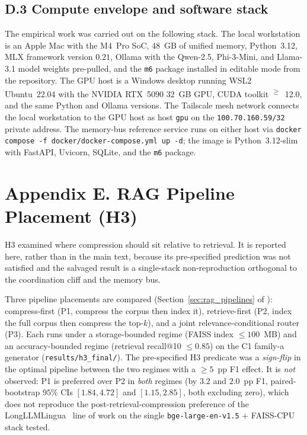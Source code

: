 \subsection{D.3 Compute envelope and software stack}

The empirical work was carried out on the following stack.
The local workstation is an Apple Mac with the M4~Pro SoC,
$48$~GB of unified memory, Python~3.12, MLX framework version
$0.21$, Ollama with the Qwen-2.5, Phi-3-Mini,
and Llama-3.1 model weights pre-pulled, and the
\texttt{m6} package installed in editable mode from the
repository. The GPU host is a Windows desktop running WSL2
Ubuntu~22.04 with the NVIDIA RTX~5090 $32$~GB GPU, CUDA toolkit
\textsuperscript{$\ge$}~12.0, and the same Python and Ollama
versions. The Tailscale mesh network connects the local
workstation to the GPU host as host \texttt{gpu} on the
\texttt{100.70.160.59/32} private address. The memory-bus
reference service runs on either host via
\texttt{docker compose -f docker/docker-compose.yml up -d}; the image is Python~3.12-slim
with FastAPI, Uvicorn, SQLite, and the \texttt{m6} package.

\section{Appendix E. RAG Pipeline Placement (H3)}
\label{appendix:rag}
\label{sec:h3_cost_caveat}

H3 examined where compression should sit relative to retrieval. It
is reported here, rather than in the main text, because its
pre-specified prediction was not satisfied and the salvaged result
is a single-stack non-reproduction orthogonal to the coordination
cliff and the memory bus.

Three pipeline placements are compared
(Section~\ref{sec:rag_pipelines} of ):
compress-first (P1, compress the corpus then index it),
retrieve-first (P2, index the full corpus then compress the
top-$k$), and a joint relevance-conditional router (P3). Each runs
under a storage-bounded regime (FAISS index $\le 100$~MB) and an
accuracy-bounded regime (retrieval recall@10 $\le 0.85$) on the C1
family-a generator (\texttt{results/h3\_final/}). The pre-specified
H3 predicate was a \emph{sign-flip} in the optimal pipeline between
the two regimes with a $\ge\!5$~pp F1 effect. It is \emph{not}
observed: P1 is preferred over P2 in \emph{both} regimes (by $3.2$
and $2.0$~pp F1, paired-bootstrap $95\%$ CIs $[1.84, 4.72]$ and
$[1.15, 2.85]$, both excluding zero), which does not reproduce the
post-retrieval-compression preference of the
LongLLMLingua~\cite{jiang2024longllmlingua} line of work on the
single \texttt{bge-large-en-v1.5} + FAISS-CPU stack tested.

